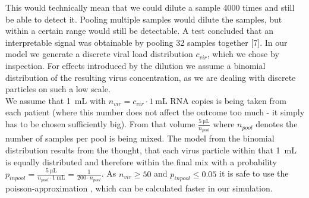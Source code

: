 \documentclass[fleqn,10pt]{wlscirep}
\begin{document}
	This would technically mean that we could dilute a sample 4000 times and still be able to detect it. Pooling multiple samples would dilute the samples, but within a certain range would still be detectable. A test concluded that an interpretable signal was obtainable by pooling 32 samples together [7]. In our model we generate a discrete viral load distribution $c_{vir}$, which we chose by inspection. For effects introduced by the dilution we assume a binomial distribution of the resulting virus concentration, as we are dealing with discrete particles on such a low scale. \\
	
	We assume that \SI{1}{\milli\liter} with $n_{vir} = c_{vir} \cdot \SI{1}{\milli\liter}$ RNA copies is being taken from each patient (where this number does not affect the outcome too much - it simply has to be chosen sufficiently big). From that volume $\frac{\SI{5}{\micro\liter}}{n_{pool}}$ where $n_{pool}$ denotes the number of samples per pool is being mixed. The model from the binomial distribution results from the thought, that each virus particle within that \SI{1}{\milli\liter} is equally distributed and therefore within the final mix with a probability $p_{in pool} = \frac{\SI{5}{\micro\liter}}{n_{pool} \cdot \SI{1}{\milli\liter}} = \frac{1}{200 \cdot n_{pool}}$. As $n_{vir} \geq 50$ and $p_{in pool} \leq 0.05$ it is safe to use the poisson-approximation \cite{poisson_approx}, which can be calculated faster in our simulation.
	
	
	
	
\end{document}
